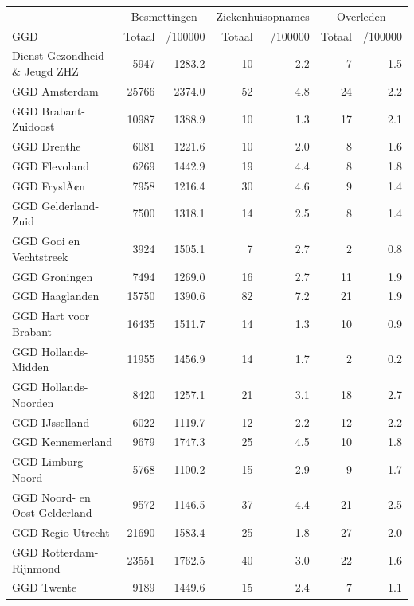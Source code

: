 \documentclass[
  english,
  man,floatsintext]{apa6}
\begin{document}
\begin{table}
\centering\begingroup\fontsize{10}{12}\selectfont

\begin{threeparttable}
\begin{tabular}{lrrrrrr}
\toprule
\multicolumn{1}{c}{ } & \multicolumn{2}{c}{Besmettingen} & \multicolumn{2}{c}{Ziekenhuisopnames} & \multicolumn{2}{c}{Overleden} \\
\cmidrule(l{3pt}r{3pt}){2-3} \cmidrule(l{3pt}r{3pt}){4-5} \cmidrule(l{3pt}r{3pt}){6-7}
GGD & Totaal & /100000 & Totaal & /100000 & Totaal & /100000\\
\midrule
Dienst Gezondheid \& Jeugd ZHZ & 5947 & 1283.2 & 10 & 2.2 & 7 & 1.5\\
GGD Amsterdam & 25766 & 2374.0 & 52 & 4.8 & 24 & 2.2\\
GGD Brabant-Zuidoost & 10987 & 1388.9 & 10 & 1.3 & 17 & 2.1\\
GGD Drenthe & 6081 & 1221.6 & 10 & 2.0 & 8 & 1.6\\
GGD Flevoland & 6269 & 1442.9 & 19 & 4.4 & 8 & 1.8\\
GGD FryslÃ¢n & 7958 & 1216.4 & 30 & 4.6 & 9 & 1.4\\
GGD Gelderland-Zuid & 7500 & 1318.1 & 14 & 2.5 & 8 & 1.4\\
GGD Gooi en Vechtstreek & 3924 & 1505.1 & 7 & 2.7 & 2 & 0.8\\
GGD Groningen & 7494 & 1269.0 & 16 & 2.7 & 11 & 1.9\\
GGD Haaglanden & 15750 & 1390.6 & 82 & 7.2 & 21 & 1.9\\
GGD Hart voor Brabant & 16435 & 1511.7 & 14 & 1.3 & 10 & 0.9\\
GGD Hollands-Midden & 11955 & 1456.9 & 14 & 1.7 & 2 & 0.2\\
GGD Hollands-Noorden & 8420 & 1257.1 & 21 & 3.1 & 18 & 2.7\\
GGD IJsselland & 6022 & 1119.7 & 12 & 2.2 & 12 & 2.2\\
GGD Kennemerland & 9679 & 1747.3 & 25 & 4.5 & 10 & 1.8\\
GGD Limburg-Noord & 5768 & 1100.2 & 15 & 2.9 & 9 & 1.7\\
GGD Noord- en Oost-Gelderland & 9572 & 1146.5 & 37 & 4.4 & 21 & 2.5\\
GGD Regio Utrecht & 21690 & 1583.4 & 25 & 1.8 & 27 & 2.0\\
GGD Rotterdam-Rijnmond & 23551 & 1762.5 & 40 & 3.0 & 22 & 1.6\\
GGD Twente & 9189 & 1449.6 & 15 & 2.4 & 7 & 1.1\\

\end{tabular}
\end{threeparttable}
\end{table}
\end{document}
